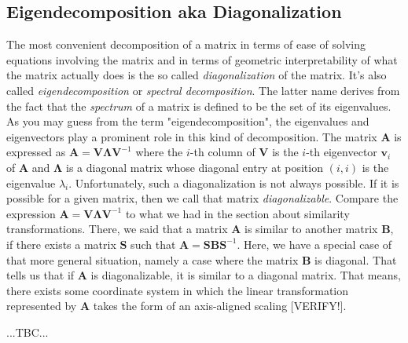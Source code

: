 
\subsection{Eigendecomposition aka Diagonalization}
The most convenient decomposition of a matrix in terms of ease of solving equations involving the matrix and in terms of geometric interpretability of what the matrix actually does is the so called \emph{diagonalization} of the matrix. It's also called \emph{eigendecomposition} or \emph{spectral decomposition}. The latter name derives from the fact that the \emph{spectrum} of a matrix is defined to be the set of its eigenvalues. As you may guess from the term "eigendecomposition", the eigenvalues and eigenvectors play a prominent role in this kind of decomposition. The matrix $\mathbf{A}$ is expressed as $\mathbf{A} = \mathbf{V} \mathbf{\Lambda} \mathbf{V}^{-1}$ where the $i$-th column of $\mathbf{V}$ is the $i$-th eigenvector $\mathbf{v}_i$ of $\mathbf{A}$ and $\mathbf{\Lambda}$ is a diagonal matrix whose diagonal entry at position $(i,i)$ is the eigenvalue $\lambda_i$. Unfortunately, such a diagonalization is not always possible. If it is possible for a given matrix, then we call that matrix \emph{diagonalizable}. Compare the expression $\mathbf{A} = \mathbf{V} \mathbf{\Lambda} \mathbf{V}^{-1}$ to what we had in the section about similarity transformations. There, we said that a matrix $\mathbf{A}$ is similar to another matrix $\mathbf{B}$, if there exists a matrix $\mathbf{S}$ such that $\mathbf{A} = \mathbf{S} \mathbf{B} \mathbf{S}^{-1}$. Here, we have a special case of that more general situation, namely a case where the matrix $\mathbf{B}$ is diagonal. That tells us that if $\mathbf{A}$ is diagonalizable, it is similar to a diagonal matrix. That means, there exists some coordinate system in which the linear transformation represented by $\mathbf{A}$ takes the form of an axis-aligned scaling [VERIFY!].



...TBC...

% 





